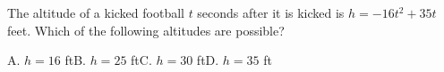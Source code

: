 The altitude of a kicked football $t$ seconds after it is kicked is $h=-16t^2+35t$ feet. Which of the following altitudes are possible?

A. $h=16$ ft\qquad B. $h=25$ ft\qquad C. $h=30$ ft\qquad D. $h=35$ ft
